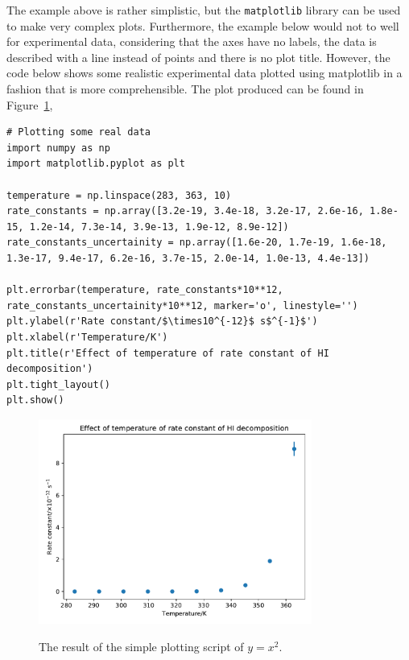 \documentclass[a4paper]{article}
\begin{document}
The example above is rather simplistic, but the \texttt{matplotlib} library can be used to make very complex plots.
Furthermore, the example below would not to well for experimental data, considering that the axes have no labels, the data is described with a line instead of points and there is no plot title.
However, the code below shows some realistic experimental data plotted using matplotlib in a fashion that is more comprehensible.
The plot produced can be found in Figure~\ref{fig:real},
\begin{lstlisting}
# Plotting some real data
import numpy as np
import matplotlib.pyplot as plt

temperature = np.linspace(283, 363, 10)
rate_constants = np.array([3.2e-19, 3.4e-18, 3.2e-17, 2.6e-16, 1.8e-15, 1.2e-14, 7.3e-14, 3.9e-13, 1.9e-12, 8.9e-12])
rate_constants_uncertainity = np.array([1.6e-20, 1.7e-19, 1.6e-18, 1.3e-17, 9.4e-17, 6.2e-16, 3.7e-15, 2.0e-14, 1.0e-13, 4.4e-13])

plt.errorbar(temperature, rate_constants*10**12, rate_constants_uncertainity*10**12, marker='o', linestyle='')
plt.ylabel(r'Rate constant/$\times10^{-12}$ s$^{-1}$')
plt.xlabel(r'Temperature/K')
plt.title(r'Effect of temperature of rate constant of HI decomposition')
plt.tight_layout()
plt.show()
\end{lstlisting}
%
\begin{figure}[t]
\centering
\includegraphics[width=0.8\textwidth]{real}
\label{fig:real}
\caption{The result of the simple plotting script of $y = x ^ 2$.}
\end{figure}
%
\vspace{\baselineskip}
\begin{center}
	\noindent{}
\end{center}
\end{document}
